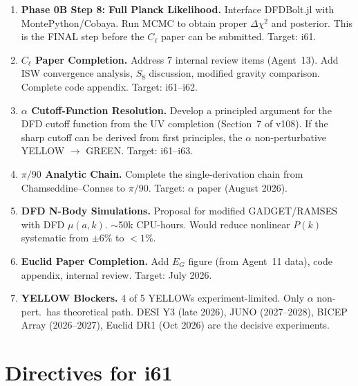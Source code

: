 \documentclass[11pt,a4paper]{article}
\begin{document}
\begin{enumerate}[label=\textbf{P\arabic*.}]
\item \textbf{Phase 0B Step 8: Full Planck Likelihood.} Interface DFDBolt.jl with MontePython/Cobaya. Run MCMC to obtain proper $\Delta\chi^2$ and posterior. This is the FINAL step before the $C_\ell$ paper can be submitted. Target: i61.

\item \textbf{$C_\ell$ Paper Completion.} Address 7 internal review items (Agent~13). Add ISW convergence analysis, $S_8$ discussion, modified gravity comparison. Complete code appendix. Target: i61--i62.

\item \textbf{$\alpha$ Cutoff-Function Resolution.} Develop a principled argument for the DFD cutoff function from the UV completion (Section~7 of v108). If the sharp cutoff can be derived from first principles, the $\alpha$ non-perturbative YELLOW $\to$ GREEN. Target: i61--i63.

\item \textbf{$\pi/90$ Analytic Chain.} Complete the single-derivation chain from Chamseddine--Connes to $\pi/90$. Target: $\alpha$ paper (August 2026).

\item \textbf{DFD N-Body Simulations.} Proposal for modified GADGET/RAMSES with DFD $\mu(a,k)$. $\sim$50k CPU-hours. Would reduce nonlinear $P(k)$ systematic from $\pm 6\%$ to $< 1\%$.

\item \textbf{Euclid Paper Completion.} Add $E_G$ figure (from Agent~11 data), code appendix, internal review. Target: July 2026.

\item \textbf{YELLOW Blockers.} 4 of 5 YELLOWs experiment-limited. Only $\alpha$ non-pert.\ has theoretical path. DESI Y3 (late 2026), JUNO (2027--2028), BICEP Array (2026--2027), Euclid DR1 (Oct 2026) are the decisive experiments.
\end{enumerate}


\section{Directives for i61}
\label{sec:directives}
\end{document}
